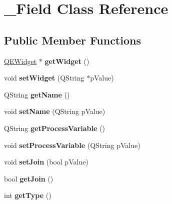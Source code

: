 \hypertarget{class__Field}{
\section{\_\-Field Class Reference}
\label{class__Field}
}
\subsection*{Public Member Functions}
\begin{DoxyCompactItemize}
\item 
\hypertarget{class__Field_a10316ec02164c1cbc0f7138138b2ddc6}{
\hyperlink{classQEWidget}{QEWidget} $\ast$ {\bfseries getWidget} ()}
\label{class__Field_a10316ec02164c1cbc0f7138138b2ddc6}

\item 
\hypertarget{class__Field_afa22ee566481a0d0a93dd0ff51173d75}{
void {\bfseries setWidget} (QString $\ast$pValue)}
\label{class__Field_afa22ee566481a0d0a93dd0ff51173d75}

\item 
\hypertarget{class__Field_a1caa518183356faf50a60059f8befb5f}{
QString {\bfseries getName} ()}
\label{class__Field_a1caa518183356faf50a60059f8befb5f}

\item 
\hypertarget{class__Field_a9a47268c76930bd553cf50d30ad17950}{
void {\bfseries setName} (QString pValue)}
\label{class__Field_a9a47268c76930bd553cf50d30ad17950}

\item 
\hypertarget{class__Field_a87d6c7248058aab39f7d9fa2c1d7c772}{
QString {\bfseries getProcessVariable} ()}
\label{class__Field_a87d6c7248058aab39f7d9fa2c1d7c772}

\item 
\hypertarget{class__Field_af21bea0495aa3222902be83d4b0ced5c}{
void {\bfseries setProcessVariable} (QString pValue)}
\label{class__Field_af21bea0495aa3222902be83d4b0ced5c}

\item 
\hypertarget{class__Field_ad319db7be30968f50d414ffeb9b169cc}{
void {\bfseries setJoin} (bool pValue)}
\label{class__Field_ad319db7be30968f50d414ffeb9b169cc}

\item 
\hypertarget{class__Field_ae0c16b842d312a4cb0f0497fb7f68ff9}{
bool {\bfseries getJoin} ()}
\label{class__Field_ae0c16b842d312a4cb0f0497fb7f68ff9}

\item 
\hypertarget{class__Field_a4a843a04acdf2e4f675846c263773c9e}{
int {\bfseries getType} ()}
\label{class__Field_a4a843a04acdf2e4f675846c263773c9e}


\end{DoxyCompactItemize}
